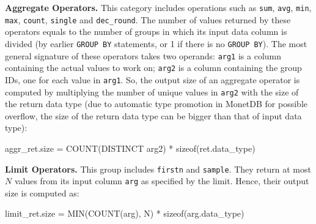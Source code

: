 \documentclass[conference]{IEEEtran}
\def\Skip{\par\medskip\nobreak\noindent}
\begin{document}
\Skip\textbf{Aggregate Operators.}
This category includes operations such as \texttt{\small sum}, \texttt{\small avg}, \texttt{\small min}, \texttt{\small max}, \texttt{\small count}, \texttt{\small single} and \texttt{\small dec\_round}.
%
%
%
%
%
The number of values returned by these operators equals to the number of groups in which its input data column is divided (by earlier \texttt{\small GROUP BY} statements, or 1 if there is no \texttt{\small GROUP BY}).
The most general signature of these operators takes two operands: \texttt{\small arg1} is a column containing the actual values to work on; \texttt{\small arg2} is a column containing the group IDs, one for each value in \texttt{\small arg1}.
So, the output size of an aggregate operator is computed by multiplying the number of unique values in \texttt{\small arg2} with the size of the return data type (due to automatic type promotion in MonetDB for possible overflow, the size of the return data type can be bigger than that of input data type):
\begin{verb}
aggr_ret.size = COUNT(DISTINCT arg2) * sizeof(ret.data_type)
\end{verb}

\Skip\textbf{Limit Operators.}
%
This group includes \texttt{\small firstn} and \texttt{\small sample}.
They return at most $N$ values from its input column \texttt{\small arg} as specified by the limit.
Hence, their output size is computed as:
\begin{verb}
limit_ret.size = MIN(COUNT(arg), N) * sizeof(arg.data_type)
\end{verb}
\end{document}
